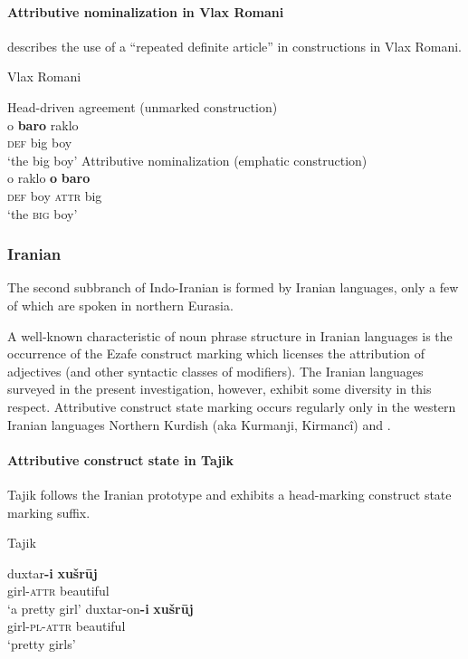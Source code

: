 \paragraph*{Attributive nominalization in Vlax Romani}
\citet{hancock1995} describes the use of a “repeated definite article” in  constructions in Vlax Romani. 
\begin{exe}
\ex \rm{Vlax Romani \citep[30]{hancock1995}}
\begin{xlist}
\ex \rm{Head\hyp{}driven agreement (unmarked construction)}\\
\gll	o \textbf{baro} raklo\\
	\textsc{def}	big	boy\\
\glt ‘the big boy’
\ex \rm{Attributive nominalization (emphatic construction)}\\
\gll	o raklo \textbf{o} \textbf{baro}\\
	\textsc{def}	{boy}	\textsc{attr} big\\
\glt	‘the \textsc{big} boy’
\end{xlist}
\end{exe}

\subsubsection{Iranian}
\label{iranian synchr}
The second subbranch of Indo-Iranian is formed by Iranian languages, only a few of which are spoken in northern Eurasia.

A well-known characteristic of noun phrase structure in Iranian languages is the occurrence of the Ezafe construct marking which licenses the attribution of adjectives (and other syntactic classes of modifiers). The Iranian languages surveyed in the present investigation, however, exhibit some diversity in this respect. Attributive construct state marking occurs regularly only in the western Iranian languages Northern Kurdish (aka Kurmanji, Kirmancî) and .

\paragraph*{Attributive construct state in Tajik}
Tajik follows the Iranian prototype and exhibits a head-marking construct state marking suffix.
\begin{exe}
\ex \rm{Tajik \citep{rastorgueva1963}}
\begin{xlist}
\ex
\gll	duxtar\textbf{-i} \textbf{xušrūj}\\
	girl-\textsc{attr} beautiful\\
\glt	‘a pretty girl’
\ex
\gll	duxtar-on\textbf{-i} \textbf{xušrūj}\\
	girl-\textsc{pl}-\textsc{attr} beautiful\\
\glt	‘pretty girls’
\end{xlist}
\end{exe}

